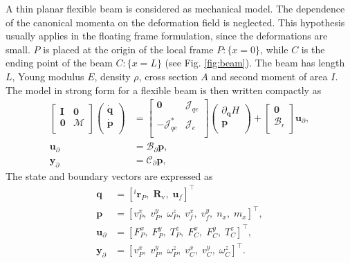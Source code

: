 A thin planar flexible beam is considered as mechanical model. The dependence of the canonical momenta on the deformation field is neglected. This hypothesis usually applies in the floating frame formulation, since the deformations are small. $P$ is placed at the origin of the local frame $P:\{x=0\}$, while $C$ is the ending point of the beam $C:\{x=L\}$ (see Fig. \ref{fig:beam}). The beam has length $L$, Young modulus $E$, density $\rho$, cross section $A$ and second moment of area $I$. The model in strong form for a flexible beam is then written compactly as 
\begin{equation}
\label{eq:EB_str_phdae}
\begin{aligned}
\begin{bmatrix}
\bm{I} & \bm{0} \\
\bm{0} & \mathcal{M} \\
\end{bmatrix}
\begin{pmatrix}
\dot{\bm{q}} \\
\dot{\bm{p}} \\
\end{pmatrix}
&= \begin{bmatrix}
\bm{0} & {\mathcal{J}}_{qe} \\
-{\mathcal{J}}_{qe}^* & {\mathcal{J}}_e \\
\end{bmatrix}
\begin{pmatrix}
\partial_{\bm{q}} H \\
\bm{p}  \\
\end{pmatrix} + 
\begin{bmatrix}
\bm{0} \\
{\mathcal{B}}_r \\
\end{bmatrix} \bm{u}_\partial, \\
\bm{u}_\partial &= {\mathcal{B}}_{\partial} \bm{p}, \\
\bm{y}_\partial &= {\mathcal{C}}_{\partial} \bm{p},
\end{aligned}
\end{equation}
The state and boundary vectors are expressed as
\begin{align*}
\bm{q} &= [^i\bm{r}_P, \; \bm{R}_{\text{v}}, \; \bm{u}_f]^\top \\
\bm{p} &= [v_P^x, \; v_P^y, \; \omega_P^z, \; v_f^x, \; v_f^y, \; n_x, \; m_{x}]^\top, \\
\bm{u}_\partial &=  [F_{P}^x, \; F_{P}^y, \; T_{P}^z, \; F_{C}^x, \; F_{C}^y, \; T_{C}^z]^\top, \\
\bm{y}_\partial &=  [v_{P}^x, \; v_{P}^y, \; \omega_{P}^z, \; v_{C}^x, \; v_{C}^y, \; \omega_{C}^z]^\top.
\end{align*}
